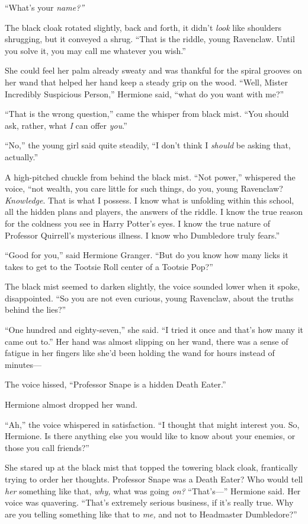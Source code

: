 ``What's your \emph{name?''}

The black cloak rotated slightly, back and forth, it didn't \emph{look}
like shoulders shrugging, but it conveyed a shrug. ``That is the riddle,
young Ravenclaw. Until you solve it, you may call me whatever you
wish.''

She could feel her palm already sweaty and was thankful for the spiral
grooves on her wand that helped her hand keep a steady grip on the wood.
``Well, Mister Incredibly Suspicious Person,'' Hermione said, ``what do
you want with me?''

``That is the wrong question,'' came the whisper from black mist. ``You
should ask, rather, what \emph{I} can offer \emph{you}.''

``No,'' the young girl said quite steadily, ``I don't think I
\emph{should} be asking that, actually.''

A high-pitched chuckle from behind the black mist. ``Not power,''
whispered the voice, ``not wealth, you care little for such things, do
you, young Ravenclaw? \emph{Knowledge}. That is what I possess. I know
what is unfolding within this school, all the hidden plans and players,
the answers of the riddle. I know the true reason for the coldness you
see in Harry Potter's eyes. I know the true nature of Professor
Quirrell's mysterious illness. I know who Dumbledore truly fears.''

``Good for you,'' said Hermione Granger. ``But do you know how many
licks it takes to get to the Tootsie Roll center of a Tootsie Pop?''

The black mist seemed to darken slightly, the voice sounded lower when
it spoke, disappointed. ``So you are not even curious, young Ravenclaw,
about the truths behind the lies?''

``One hundred and eighty-seven,'' she said. ``I tried it once and that's
how many it came out to.'' Her hand was almost slipping on her wand,
there was a sense of fatigue in her fingers like she'd been holding the
wand for hours instead of minutes---

The voice hissed, ``Professor Snape is a hidden Death Eater.''

Hermione almost dropped her wand.

``Ah,'' the voice whispered in satisfaction. ``I thought that might
interest you. So, Hermione. Is there anything else you would like to
know about your enemies, or those you call friends?''

She stared up at the black mist that topped the towering black cloak,
frantically trying to order her thoughts. Professor Snape was a Death
Eater? Who would tell \emph{her} something like that, \emph{why,} what
was going \emph{on?} ``That's---'' Hermione said. Her voice was
quavering. ``That's extremely serious business, if it's really true. Why
are you telling something like that to \emph{me,} and not to Headmaster
Dumbledore?''

